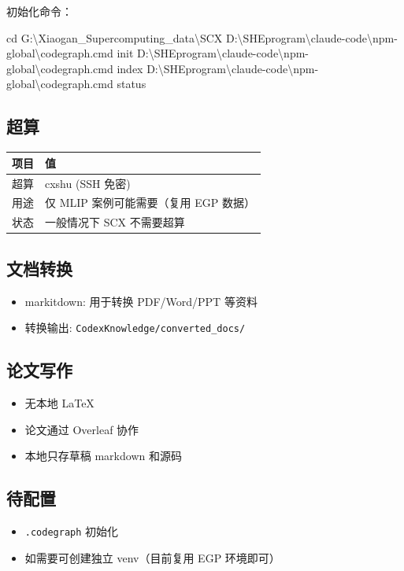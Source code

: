 \documentclass[
  12pt,
]{ctexart}
\newenvironment{Shaded}{}{}
\newcommand{\BuiltInTok}[1]{\textcolor[rgb]{0.00,0.50,0.00}{#1}}
\newcommand{\DataTypeTok}[1]{\textcolor[rgb]{0.56,0.13,0.00}{#1}}
\newcommand{\ExtensionTok}[1]{#1}
\newcommand{\NormalTok}[1]{#1}
\providecommand{\tightlist}{%
  \setlength{\itemsep}{0pt}\setlength{\parskip}{0pt}}
\begin{document}
初始化命令：

\begin{Shaded}
\begin{Highlighting}[]
\BuiltInTok{cd}\NormalTok{ G:}\DataTypeTok{\textbackslash{}X}\NormalTok{iaogan\_Supercomputing\_data}\DataTypeTok{\textbackslash{}S}\NormalTok{CX}
\ExtensionTok{D:\textbackslash{}SHEprogram\textbackslash{}claude{-}code\textbackslash{}npm{-}global\textbackslash{}codegraph.cmd}\NormalTok{ init}
\ExtensionTok{D:\textbackslash{}SHEprogram\textbackslash{}claude{-}code\textbackslash{}npm{-}global\textbackslash{}codegraph.cmd}\NormalTok{ index}
\ExtensionTok{D:\textbackslash{}SHEprogram\textbackslash{}claude{-}code\textbackslash{}npm{-}global\textbackslash{}codegraph.cmd}\NormalTok{ status}
\end{Highlighting}
\end{Shaded}

\subsection{超算}\label{ux8d85ux7b97}

\begin{longtable}[]{@{}ll@{}}
\toprule\noalign{}
项目 & 值 \\
\midrule\noalign{}
\endhead
\bottomrule\noalign{}
\endlastfoot
超算 & cxshu (SSH 免密) \\
用途 & 仅 MLIP 案例可能需要（复用 EGP 数据） \\
状态 & 一般情况下 SCX 不需要超算 \\
\end{longtable}

\subsection{文档转换}\label{ux6587ux6863ux8f6cux6362}

\begin{itemize}
\tightlist
\item
  markitdown: 用于转换 PDF/Word/PPT 等资料
\item
  转换输出: \texttt{CodexKnowledge/converted\_docs/}
\end{itemize}

\subsection{论文写作}\label{ux8bbaux6587ux5199ux4f5c}

\begin{itemize}
\tightlist
\item
  无本地 LaTeX
\item
  论文通过 Overleaf 协作
\item
  本地只存草稿 markdown 和源码
\end{itemize}

\subsection{待配置}\label{ux5f85ux914dux7f6e}

\begin{itemize}
\tightlist
\item[$\square$]
  \texttt{.codegraph} 初始化
\item[$\square$]
  如需要可创建独立 venv（目前复用 EGP 环境即可）
\end{itemize}
\end{document}
